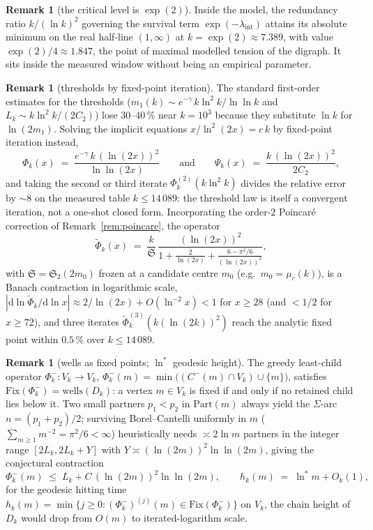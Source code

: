 \documentclass[11pt]{article}
\theoremstyle{plain}
\theoremstyle{definition}
\newtheorem{remark}[theorem]{Remark}
\newcommand{\Vk}{V_{k}}
\newcommand{\Dk}{D_{k}}
\newcommand{\lam}{\lambda_{\mathrm{int}}}
\newcommand{\wells}{\mathrm{wells}}
\newcommand{\dd}{\mathrm{d}}
\begin{document}
\begin{remark}[the critical level is $\exp(2)$]
\label{rem:kcrit}
Inside the model, the redundancy ratio $k/(\ln k)^2$ governing the
survival term $\exp(-\lam)$ attains its absolute minimum on the real
half-line $(1,\infty)$ at $k = \exp(2) \approx 7.389$, with value
$\exp(2)/4 \approx 1.847$, the point of maximal modelled tension of
the digraph. It sits inside the measured window without being an
empirical parameter.
\end{remark}

\begin{remark}[thresholds by fixed-point iteration]
\label{rem:fixpoint}
The standard first-order estimates for the thresholds ($m_1(k)
\sim e^{-\gamma}\, k \ln^{2} k / \ln\ln k$ and
$L_k \sim k \ln^{2} k / (2C_2)$) lose $30$--$40\,\%$ near
$k = 10^{3}$ because they substitute $\ln k$ for $\ln(2m_1)$.
Solving the implicit equations $x/\ln^{2}(2x) = c\,k$ by fixed-point
iteration instead,
\[
\Phi_k(x) \;=\; \frac{e^{-\gamma}\,k\,(\ln(2x))^{2}}{\ln\ln(2x)}
\qquad\text{and}\qquad
\Psi_k(x) \;=\; \frac{k\,(\ln(2x))^{2}}{2C_2},
\]
and taking the second or third iterate $\Phi_k^{(2)}(k \ln^{2} k)$
divides the relative error by $\sim 8$ on the measured table
$k \le 14\,089$: the threshold law is itself a convergent iteration,
not a one-shot closed form. Incorporating the order-$2$ Poincar\'e
correction of Remark~\ref{rem:poincare}, the operator
\[
\widetilde{\Phi}_k(x) \;=\; \frac{k}{\mathfrak{S}}\,
\frac{(\ln(2x))^{2}}
     {1 + \tfrac{2}{\ln(2x)} + \tfrac{6 - \pi^{2}/6}{(\ln(2x))^{2}}},
\]
with $\mathfrak{S} = \mathfrak{S}_2(2m_0)$ frozen at a candidate
centre $m_0$ (e.g.\ $m_0 = \mu_c(k)$), is a Banach contraction in
logarithmic scale,
$|\dd\ln \widetilde{\Phi}_k / \dd\ln x| \approx 2/\ln(2x) +
O(\ln^{-2}x) < 1$ for $x \ge 28$ (and $< 1/2$ for $x \ge 72$), and
three iterates $\widetilde{\Phi}_k^{(3)}(k(\ln(2k))^{2})$ reach the
analytic fixed point within $0.5\,\%$ over $k \le 14\,089$.
\end{remark}

\begin{remark}[wells as fixed points; $\ln^{\ast}$ geodesic height]
\label{rem:phik}
The greedy least-child operator $\Phi_k^{-} : \Vk \to \Vk$,
$\Phi_k^{-}(m) = \min\bigl((C^{-}(m) \cap \Vk) \cup \{m\}\bigr)$,
satisfies $\mathrm{Fix}(\Phi_k^{-}) = \wells(\Dk)$: a vertex
$m \in \Vk$ is fixed if and only if no retained child lies below it.
Two small partners $p_1 < p_2$ in $\mathrm{Part}(m)$ always yield
the $\Sigma$-arc $n = (p_1 + p_2)/2$; surviving Borel--Cantelli
uniformly in $m$ ($\sum_{m \ge 1} m^{-2} = \pi^2/6 < \infty$)
heuristically needs $\asymp 2\ln m$ partners in the integer range
$[2L_k, 2L_k + Y]$ with $Y \asymp (\ln(2m))^{2}\ln\ln(2m)$, giving
the conjectural contraction
\[
\Phi_k^{-}(m) \;\le\; L_k +
C\,(\ln(2m))^{2}\ln\ln(2m),
\qquad
h_k(m) \;=\; \ln^{\ast} m + O_k(1),
\]
for the geodesic hitting time
$h_k(m) = \min\{j \ge 0 : (\Phi_k^{-})^{(j)}(m) \in
\mathrm{Fix}(\Phi_k^{-})\}$ on $\Vk$, the chain height of $\Dk$
would drop from $O(m)$ to iterated-logarithm scale.
\end{remark}
\end{document}
